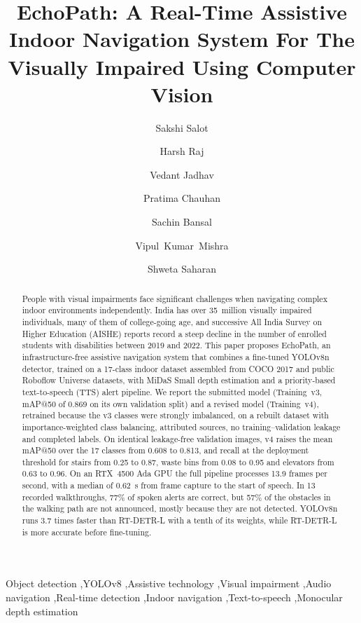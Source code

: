 \documentclass[3p,times,procedia]{elsarticle}
\DeclareRobustCommand{\rev}[1]{{\hlattr=1 #1}}
\DeclareRobustCommand{\rev}[1]{\hl{#1}}
\DeclareRobustCommand{\rev}[1]{#1}
\begin{document}
\begin{frontmatter}


\title{EchoPath: A Real-Time Assistive Indoor Navigation System For The
Visually Impaired Using Computer Vision}

\author[a]{Sakshi Salot}
\author[a]{Harsh Raj}
\author[a]{Vedant Jadhav}
\author[a]{Pratima Chauhan}
\author[a]{Sachin Bansal}
\author[a]{Vipul~Kumar~Mishra}
\author[a]{Shweta Saharan}

\address[a]{Department of Artificial Intelligence and Data Science, Gati Shakti
Vishwavidyalaya, Vadodara, Gujarat 390004, India}

\begin{abstract}
People with visual impairments face significant challenges when navigating
complex indoor environments independently. India has over 35~million
visually impaired individuals, many of them of college-going age, and
successive All India Survey on Higher Education (AISHE) reports record a
steep decline in the number of enrolled students with disabilities between
2019 and 2022. This paper proposes EchoPath, an infrastructure-free
assistive navigation system that combines a fine-tuned YOLOv8n detector,
\rev{trained on a 17-class indoor dataset assembled from COCO 2017 and
public Roboflow Universe datasets}, with MiDaS Small depth estimation and a
priority-based text-to-speech (TTS) alert pipeline. We report the
submitted model (Training~v3, mAP@50 of 0.869 on its own validation split)
and a revised model (Training~v4), retrained because the v3 classes were
strongly imbalanced, on a rebuilt dataset with importance-weighted class
balancing, attributed sources, no training--validation leakage and completed
labels. \rev{On identical leakage-free validation images, v4 raises the mean
mAP@50 over the 17 classes from 0.608 to 0.813}, and recall at the deployment
threshold for stairs from 0.25 to 0.87, waste bins from 0.08 to 0.95 and
elevators from 0.63 to 0.96. \rev{On an RTX~4500 Ada GPU the full pipeline
processes 13.9 frames per second, with a median of 0.62~s from frame capture
to the start of speech.} \rev{In 13 recorded walkthroughs, 77\% of spoken alerts
are correct, but 57\% of the obstacles in the walking path are not
announced}, mostly because they are not detected. YOLOv8n runs 3.7 times
faster than RT-DETR-L with a tenth of its weights, while RT-DETR-L is more
accurate before fine-tuning.
\end{abstract}

\begin{keyword}
Object detection \sep YOLOv8 \sep Assistive technology \sep Visual
impairment \sep Audio navigation \sep Real-time detection \sep Indoor
navigation \sep Text-to-speech \sep Monocular depth estimation
\end{keyword}

\end{frontmatter}
\end{document}
